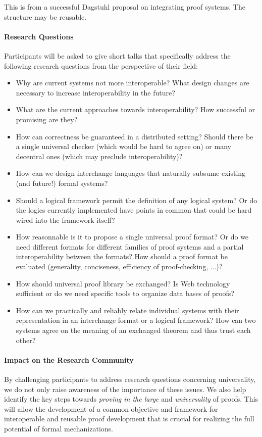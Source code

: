 \begin{oldpart}{This is from a successful Dagstuhl proposal on integrating proof systems. The structure may be reusable.}
\paragraph{Research Questions}
Participants will be asked to give short talks that specifically address the following research questions from the perspective of their field:

\begin{itemize}
\item Why are current systems not more interoperable? What design changes are necessary to increase interoperability in the future?
\item What are the current approaches towards interoperability? How successful or promising are they?
\item How can correctness be guaranteed in a distributed setting?
 Should there be a single universal checker (which would be hard to agree on) or many decentral ones (which may preclude interoperability)?
\item How can we design interchange languages that naturally subsume
  existing (and future!) formal systems?
\item Should a logical framework permit the definition of any logical system?
Or do the logics currently implemented have points in common that could
be hard wired into the framework itself?
\item How reasonnable is it to propose a single universal proof format?
Or do we need different formats for different families of
proof systems and a partial interoperability between the formats?
 How should a proof format be evaluated (generality, conciseness,
efficiency of proof-checking, ...)?
\item How should universal proof library be exchanged? Is Web technology
sufficient or do we need specific tools to organize data bases of
proofs?
\item How can we practically and reliably relate individual systems with their representation in an interchange format or a logical framework?
How can two systems agree on the meaning of an exchanged theorem and thus trust each other?
\end{itemize}

\paragraph{Impact on the Research Community}
By challenging participants to address research questions concerning
universality, we do not only raise awareness of the importance of these issues.
We also help identify the key steps towards \emph{proving in the large} and  \emph{universality} of proofs.
This will allow the development of a common objective and framework for interoperable and reusable proof development that is crucial for realizing the full potential of formal mechanizations.


\end{oldpart}
